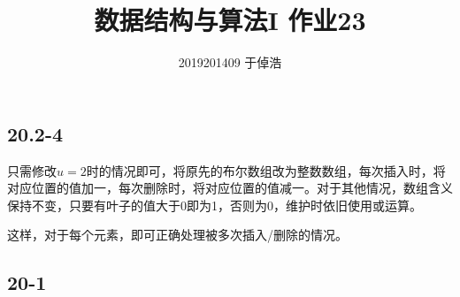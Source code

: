 \documentclass[]{article}
\title{数据结构与算法I 作业23}
\author{2019201409 于倬浩}
\begin{document}
    
\maketitle

\hypertarget{header-n282}{%
\subsection{20.2-4}\label{header-n282}}

只需修改\(u=2\)时的情况即可，将原先的布尔数组改为整数数组，每次插入时，将对应位置的值加一，每次删除时，将对应位置的值减一。对于其他情况，数组含义保持不变，只要有叶子的值大于0即为1，否则为0，维护时依旧使用或运算。

这样，对于每个元素，即可正确处理被多次插入/删除的情况。

\hypertarget{header-n286}{%
\subsection{20-1}\label{header-n286}}
\end{document}
